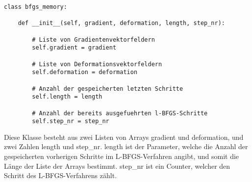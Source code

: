 \documentclass[bibliography=totoc,12pt,a4paper]{scrartcl}
\theoremstyle{exampstyle}
\numberwithin{equation}{section}
\begin{document}
\begin{lstlisting}
class bfgs_memory:

    def __init__(self, gradient, deformation, length, step_nr):

        # Liste von Gradientenvektorfeldern
        self.gradient = gradient

        # Liste von Deformationsvektorfeldern
        self.deformation = deformation

        # Anzahl der gespeicherten letzten Schritte
        self.length = length

        # Anzahl der bereits ausgefuehrten l-BFGS-Schritte
        self.step_nr = step_nr
\end{lstlisting}

Diese Klasse besteht aus zwei Listen von Arrays \textsf{gradient} und \textsf{deformation}, und zwei Zahlen \textsf{length} und \textsf{step\_nr}. 
\textsf{length} ist der Parameter, welche die Anzahl der gespeicherten vorherigen Schritte im L-BFGS-Verfahren angibt, und somit die Länge der Liste der Arrays bestimmt. \textsf{step\_nr} ist ein Counter, welcher den Schritt des L-BFGS-Verfahrens zählt. 
\end{document}
